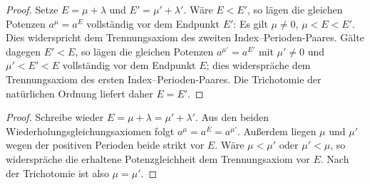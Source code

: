 \documentclass[main.tex]{subfiles}
\begin{document}
\begin{proof}
Setze \(E=\mu+\lambda\) und \(E'=\mu'+\lambda'\).  Wäre
\(E<E'\), so lägen die gleichen Potenzen \(a^\mu=a^E\) vollständig vor
dem Endpunkt \(E'\): Es gilt \(\mu\neq0\), \(\mu<E<E'\).  Dies widerspricht
dem Trennungsaxiom des zweiten Index--Perioden-Paares.  Gälte dagegen
\(E'<E\), so lägen die gleichen Potenzen
\(a^{\mu'}=a^{E'}\) mit \(\mu'\neq0\) und
\(\mu'<E'<E\) vollständig vor dem Endpunkt \(E\); dies widerspräche dem
Trennungsaxiom des ersten Index--Perioden-Paares.  Die Trichotomie der
natürlichen Ordnung liefert daher \(E=E'\).
\end{proof}

\begin{proof}
Schreibe wieder \(E=\mu+\lambda=\mu'+\lambda'\).  Aus den beiden
Wiederholungsgleichungsaxiomen folgt \(a^\mu=a^E=a^{\mu'}\).  Außerdem liegen
\(\mu\) und \(\mu'\) wegen der positiven Perioden beide strikt vor \(E\).
Wäre \(\mu<\mu'\) oder \(\mu'<\mu\), so widerspräche die erhaltene
Potenzgleichheit dem Trennungsaxiom vor \(E\).  Nach der Trichotomie ist
also \(\mu=\mu'\).
\end{proof}

\end{document}
